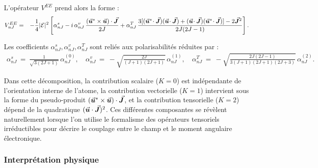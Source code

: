 


L’opérateur $V^{EE}$ prend alors la forme :
\begin{eqnarray*}
	V^{EE}_{nJ} &=& -\frac{1}{4}|\mathcal{E}|^2\left[
		\alpha^s_{nJ}
		- i\,\alpha^v_{nJ}\,\frac{(\vec{{\bm{u}}}^*\times\vec{{\bm{u}}})\cdot \vec{{\bm{J}}}}{2J}
	+ \alpha^T_{nJ}\,\frac{3[(\vec{{\bm{u}}}^*\!\cdot \vec{{\bm{J}}})(\vec{{\bm{u}}}\!\cdot\vec{{\bm{J}}})+(\vec{{\bm{u}}}\!\cdot\vec{{\bm{J}}})(\vec{{\bm{u}}}^*\!\cdot \vec{{\bm{J}}})]-2\vec{{\bm{J}}}^2}{2J(2J-1)}
\right].
\end{eqnarray*}

Les coefficients $\alpha^s_{nJ}, \alpha^v_{nJ}, \alpha^T_{nJ}$ sont reliés aux polarisabilités réduites par :
\begin{eqnarray*}
	\alpha^s_{nJ} ~=~ \frac{1}{\sqrt{3(2J+1)}}\,\alpha^{(0)}_{nJ},\quad 
	\alpha^v_{nJ} ~=~ -\sqrt{\frac{2J}{(J+1)(2J+1)}}\,\alpha^{(1)}_{nJ},\quad 
	\alpha^T_{nJ} ~=~ -\sqrt{\frac{2J(2J-1)}{3(J+1)(2J+1)(2J+3)}}\,\alpha^{(2)}_{nJ}.
\end{eqnarray*}

Dans cette décomposition, la contribution scalaire ($K=0$) est indépendante de l’orientation interne de l’atome, la contribution vectorielle ($K=1$) intervient sous la forme du pseudo-produit $(\vec{{\bm{u}}}^*\times\vec{{\bm{u}}})\cdot\vec{{\bm{J}}}$, et la contribution tensorielle ($K=2$) dépend de la quadratique $(\vec{{\bm{u}}}\cdot\vec{{\bm{J}}})^2$. Ces différentes composantes se révèlent naturellement lorsque l’on utilise le formalisme des opérateurs tensoriels irréductibles pour décrire le couplage entre le champ et le moment angulaire électronique.

\subsubsection{Interprétation physique}


